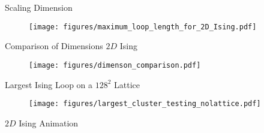 \documentclass[10pt]{beamer}
\begin{document}
\begin{frame}{Scaling Dimension}
    \begin{figure}[h!]
        \centering
            \texttt{[image: figures/maximum\_loop\_length\_for\_2D\_Ising.pdf]}
    \end{figure}
\end{frame}

\begin{frame}{Comparison of Dimensions $2D$ Ising}
    \begin{figure}[h!]
        \centering
            \texttt{[image: figures/dimenson\_comparison.pdf]}
    \end{figure}
\end{frame}

\begin{frame}{Largest Ising Loop on a $128^2$ Lattice}
    \begin{figure}[h!]
        \centering
            \texttt{[image: figures/largest\_cluster\_testing\_nolattice.pdf]}
    \end{figure}
\end{frame}

\begin{frame}{$2D$ Ising Animation}
\end{frame}
\end{document}
